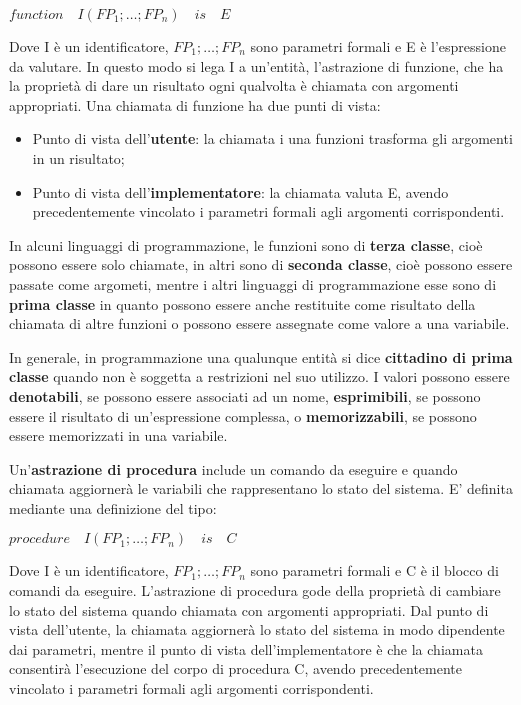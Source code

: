 \documentclass[a4paper,18pt]{extarticle}
\begin{document}
\begin{center}
    $function \quad I(FP_1;\dots;FP_n) \quad is\quad E$
\end{center}

Dove I è un identificatore, $FP_1;\dots;FP_n$ sono parametri formali e E è l'espressione da valutare. In questo modo si lega I a un'entità, l'astrazione di funzione, che ha la proprietà di dare un risultato ogni qualvolta è chiamata con argomenti appropriati. Una chiamata di funzione ha due punti di vista:
\begin{itemize}
  \item Punto di vista dell'\textbf{utente}: la chiamata i una funzioni trasforma gli argomenti in un risultato;
  \item Punto di vista dell'\textbf{implementatore}: la chiamata valuta E, avendo precedentemente vincolato i parametri formali agli argomenti corrispondenti.
\end{itemize}

In alcuni linguaggi di programmazione, le funzioni sono di \textbf{terza classe}, cioè possono essere solo chiamate, in altri sono di \textbf{seconda classe}, cioè possono essere passate come argometi, mentre i altri linguaggi di programmazione esse sono di \textbf{prima classe} in quanto possono essere anche restituite come risultato della chiamata di altre funzioni o possono essere assegnate come valore a una variabile.

In generale, in programmazione una qualunque entità si dice \textbf{cittadino di prima classe} quando non è soggetta a restrizioni nel suo utilizzo. I valori possono essere \textbf{denotabili}, se possono essere associati ad un nome, \textbf{esprimibili}, se possono essere il risultato di un'espressione complessa, o \textbf{memorizzabili}, se possono essere memorizzati in una variabile.

Un'\textbf{astrazione di procedura} include un comando da eseguire e quando chiamata aggiornerà le variabili che rappresentano lo stato del sistema. E' definita mediante una definizione del tipo:

\begin{center}
    $procedure \quad I(FP_1;\dots;FP_n) \quad is\quad C$
\end{center}

Dove I è un identificatore, $FP_1;\dots;FP_n$ sono parametri formali e C è il blocco di comandi da eseguire. L'astrazione di procedura gode della proprietà di cambiare lo stato del sistema quando chiamata con argomenti appropriati. Dal punto di vista dell'utente, la chiamata aggiornerà lo stato del sistema in modo dipendente dai parametri, mentre il punto di vista dell'implementatore è che la chiamata consentirà l'esecuzione del corpo di procedura C, avendo precedentemente vincolato i parametri formali agli argomenti corrispondenti.
\end{document}
